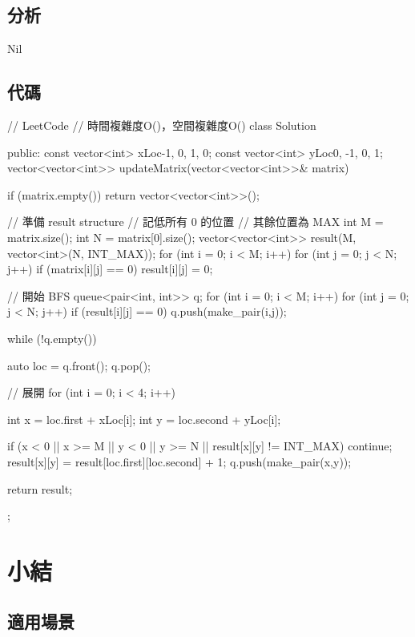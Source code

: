 \subsection{分析}
Nil

\subsection{代碼}
\begin{Code}
// LeetCode
// 時間複雜度O()，空間複雜度O()
class Solution {
public:
    const vector<int> xLoc{-1, 0, 1, 0};
    const vector<int> yLoc{0, -1, 0, 1};
    vector<vector<int>> updateMatrix(vector<vector<int>>& matrix) {
        if (matrix.empty()) return vector<vector<int>>();

        // 準備 result structure
        // 記低所有 0 的位置
        // 其餘位置為 MAX
        int M = matrix.size();
        int N = matrix[0].size();
        vector<vector<int>> result(M, vector<int>(N, INT_MAX));
        for (int i = 0; i < M; i++)
        {
            for (int j = 0; j < N; j++)
            {
                if (matrix[i][j] == 0)
                    result[i][j] = 0;
            }
        }

        // 開始 BFS
        queue<pair<int, int>> q;
        for (int i = 0; i < M; i++)
        {
            for (int j = 0; j < N; j++)
            {
                if (result[i][j] == 0)
                    q.push(make_pair(i,j));
            }
        }

        while (!q.empty())
        {
            auto loc = q.front();
            q.pop();

            // 展開
            for (int i = 0; i < 4; i++)
            {
                int x = loc.first + xLoc[i];
                int y = loc.second + yLoc[i];

                if (x < 0 || x >= M || y < 0 || y >= N || result[x][y] != INT_MAX)
                   continue;
                result[x][y] = result[loc.first][loc.second] + 1;
                q.push(make_pair(x,y));
            }
        }

        return result;
    }
};
\end{Code}
\section{小結} %
\label{sec:bfs-template}


\subsection{適用場景}

